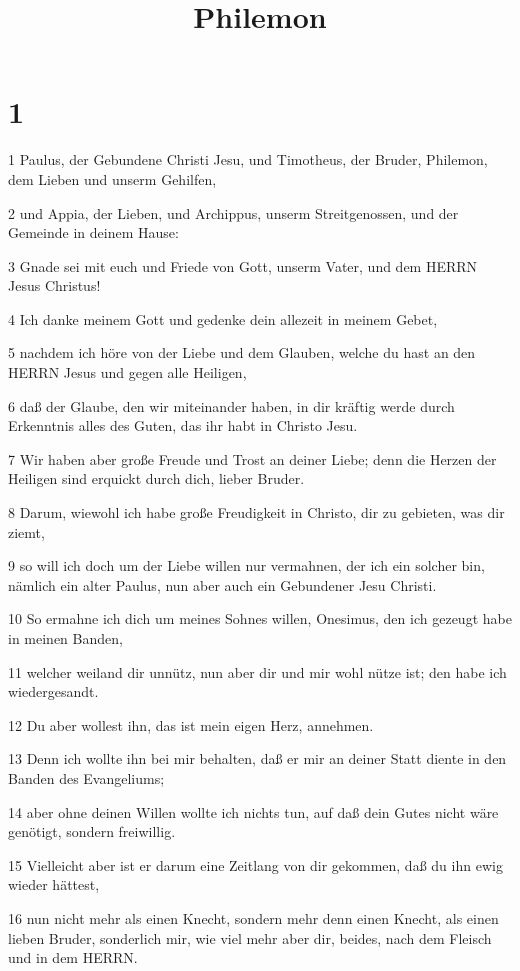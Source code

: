 

\title{Philemon}


\chapter{1}

\par 1 Paulus, der Gebundene Christi Jesu, und Timotheus, der Bruder, Philemon, dem Lieben und unserm Gehilfen,
\par 2 und Appia, der Lieben, und Archippus, unserm Streitgenossen, und der Gemeinde in deinem Hause:
\par 3 Gnade sei mit euch und Friede von Gott, unserm Vater, und dem HERRN Jesus Christus!
\par 4 Ich danke meinem Gott und gedenke dein allezeit in meinem Gebet,
\par 5 nachdem ich höre von der Liebe und dem Glauben, welche du hast an den HERRN Jesus und gegen alle Heiligen,
\par 6 daß der Glaube, den wir miteinander haben, in dir kräftig werde durch Erkenntnis alles des Guten, das ihr habt in Christo Jesu.
\par 7 Wir haben aber große Freude und Trost an deiner Liebe; denn die Herzen der Heiligen sind erquickt durch dich, lieber Bruder.
\par 8 Darum, wiewohl ich habe große Freudigkeit in Christo, dir zu gebieten, was dir ziemt,
\par 9 so will ich doch um der Liebe willen nur vermahnen, der ich ein solcher bin, nämlich ein alter Paulus, nun aber auch ein Gebundener Jesu Christi.
\par 10 So ermahne ich dich um meines Sohnes willen, Onesimus, den ich gezeugt habe in meinen Banden,
\par 11 welcher weiland dir unnütz, nun aber dir und mir wohl nütze ist; den habe ich wiedergesandt.
\par 12 Du aber wollest ihn, das ist mein eigen Herz, annehmen.
\par 13 Denn ich wollte ihn bei mir behalten, daß er mir an deiner Statt diente in den Banden des Evangeliums;
\par 14 aber ohne deinen Willen wollte ich nichts tun, auf daß dein Gutes nicht wäre genötigt, sondern freiwillig.
\par 15 Vielleicht aber ist er darum eine Zeitlang von dir gekommen, daß du ihn ewig wieder hättest,
\par 16 nun nicht mehr als einen Knecht, sondern mehr denn einen Knecht, als einen lieben Bruder, sonderlich mir, wie viel mehr aber dir, beides, nach dem Fleisch und in dem HERRN.
